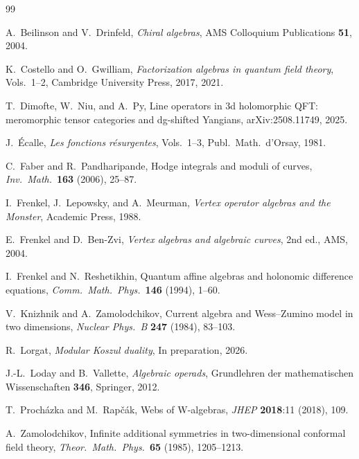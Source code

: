 \documentclass[11pt]{article}
\theoremstyle{definition}
\theoremstyle{remark}
\numberwithin{equation}{section}
\begin{document}
\begin{thebibliography}{99}

A.~Beilinson and V.~Drinfeld,
\emph{Chiral algebras},
AMS Colloquium Publications \textbf{51}, 2004.

K.~Costello and O.~Gwilliam,
\emph{Factorization algebras in quantum field theory},
Vols.~1--2, Cambridge University Press, 2017, 2021.

T.~Dimofte, W.~Niu, and A.~Py,
Line operators in 3d holomorphic QFT: meromorphic tensor
categories and dg-shifted Yangians,
arXiv:2508.11749, 2025.

J.~\'Ecalle,
\emph{Les fonctions r\'esurgentes}, Vols.~1--3,
Publ.\ Math.\ d'Orsay, 1981.

C.~Faber and R.~Pandharipande,
Hodge integrals and moduli of curves,
\emph{Inv.\ Math.}\ \textbf{163} (2006), 25--87.

I.~Frenkel, J.~Lepowsky, and A.~Meurman,
\emph{Vertex operator algebras and the Monster},
Academic Press, 1988.

E.~Frenkel and D.~Ben-Zvi,
\emph{Vertex algebras and algebraic curves},
2nd ed., AMS, 2004.

I.~Frenkel and N.~Reshetikhin,
Quantum affine algebras and holonomic difference equations,
\emph{Comm.\ Math.\ Phys.}\ \textbf{146} (1994), 1--60.

V.~Knizhnik and A.~Zamolodchikov,
Current algebra and Wess--Zumino model in two dimensions,
\emph{Nuclear Phys.\ B} \textbf{247} (1984), 83--103.

R.~Lorgat,
\emph{Modular Koszul duality},
In preparation, 2026.

J.-L.~Loday and B.~Vallette,
\emph{Algebraic operads},
Grundlehren der mathematischen Wissenschaften \textbf{346},
Springer, 2012.

T.~Proch\'azka and M.~Rap\v{c}\'ak,
Webs of W-algebras,
\emph{JHEP} \textbf{2018}:11 (2018), 109.

A.~Zamolodchikov,
Infinite additional symmetries in two-dimensional conformal
field theory,
\emph{Theor.\ Math.\ Phys.}\ \textbf{65} (1985), 1205--1213.

\end{thebibliography}
\end{document}
